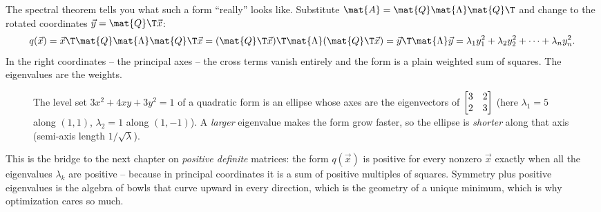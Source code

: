 The spectral theorem tells you what such a form ``really'' looks like. Substitute
$\mat{A}=\mat{Q}\mat{\Lambda}\mat{Q}\T$ and change to the rotated coordinates
$\vec{y}=\mat{Q}\T\vec{x}$:
\[
  q(\vec{x}) = \vec{x}\T\mat{Q}\mat{\Lambda}\mat{Q}\T\vec{x}
  = (\mat{Q}\T\vec{x})\T\mat{\Lambda}(\mat{Q}\T\vec{x})
  = \vec{y}\T\mat{\Lambda}\vec{y}
  = \lambda_1 y_1^2 + \lambda_2 y_2^2 + \cdots + \lambda_n y_n^2.
\]
In the right coordinates -- the principal axes -- the cross terms vanish entirely
and the form is a plain weighted sum of squares. The eigenvalues are the weights.

\begin{figure}[H]
\centering
{}
\caption{The level set $3x^2+4xy+3y^2=1$ of a quadratic form is an ellipse whose
axes are the eigenvectors of $\protect\begin{bmatrix}3&2\\2&3\protect\end{bmatrix}$
(here $\lambda_1=5$ along $(1,1)$, $\lambda_2=1$ along $(1,-1)$). A \emph{larger}
eigenvalue makes the form grow faster, so the ellipse is \emph{shorter} along that
axis (semi-axis length $1/\sqrt{\lambda}$).}
\label{ch26:fig-quadform}
\end{figure}

This is the bridge to the next chapter on \emph{positive definite} matrices: the
form $q(\vec{x})$ is positive for every nonzero $\vec{x}$ exactly when all the
eigenvalues $\lambda_k$ are positive -- because in principal coordinates it is a
sum of positive multiples of squares. Symmetry plus positive eigenvalues is the
algebra of bowls that curve upward in every direction, which is the geometry of a
unique minimum, which is why optimization cares so much.

